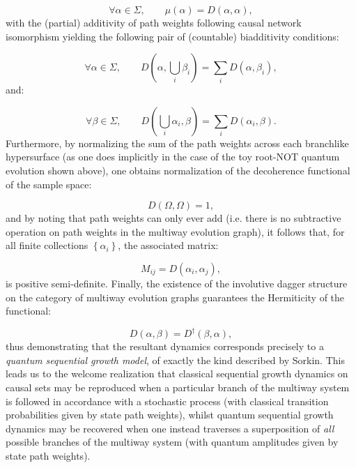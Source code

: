 \documentclass{article}
\begin{document}
\begin{equation}
\forall \alpha \in \Sigma, \qquad \mu \left( \alpha \right) = D \left( \alpha, \alpha \right),
\end{equation}
with the (partial) additivity of path weights following causal network isomorphism yielding the following pair of (countable) biadditivity conditions:

\begin{equation}
\forall \alpha \in \Sigma, \qquad D \left( \alpha, \bigcup_{i} \beta_i \right) = \sum_{i} D \left( \alpha, \beta_i \right),
\end{equation}
and:

\begin{equation}
\forall \beta \in \Sigma, \qquad D \left( \bigcup_{i} \alpha_i, \beta \right) = \sum_i D \left( \alpha_i, \beta \right).
\end{equation}
Furthermore, by normalizing the sum of the path weights across each branchlike hypersurface (as one does implicitly in the case of the toy root-NOT quantum evolution shown above), one obtains normalization of the decoherence functional of the sample space:

\begin{equation}
D \left( \Omega, \Omega \right) = 1,
\end{equation}
and by noting that path weights can only ever add (i.e. there is no subtractive operation on path weights in the multiway evolution graph), it follows that, for all finite collections ${\left\lbrace \alpha_i \right\rbrace}$, the associated matrix:

\begin{equation}
M_{i j} = D \left( \alpha_i, \alpha_j \right),
\end{equation}
is positive semi-definite. Finally, the existence of the involutive dagger structure on the category of multiway evolution graphs guarantees the Hermiticity of the functional:

\begin{equation}
D \left( \alpha, \beta \right) = D^{\dag} \left( \beta, \alpha \right),
\end{equation}
thus demonstrating that the resultant dynamics corresponds precisely to a \textit{quantum sequential growth model}, of exactly the kind described by Sorkin. This leads us to the welcome realization that classical sequential growth dynamics on causal sets may be reproduced when a particular branch of the multiway system is followed in accordance with a stochastic process (with classical transition probabilities given by state path weights), whilst quantum sequential growth dynamics may be recovered when one instead traverses a superposition of \textit{all} possible branches of the multiway system (with quantum amplitudes given by state path weights).
\end{document}
